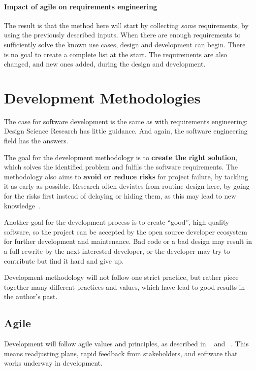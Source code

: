 \paragraph{Impact of agile on requirements engineering}
The result is that the method here will start by collecting \textit{some} requirements, by using the previously described inputs.
When there are enough requirements to sufficiently solve the known use cases, design and development can begin.
There is no goal to create a complete list at the start.
The requirements are also changed, and new ones added, during the design and development.


\section{Development Methodologies}

The case for software development is the same as with requirements engineering: Design Science Research has little guidance.
And again, the software engineering field has the answers.


The goal for the development methodology is to \textbf{create the right solution}, which solves the identified problem and fulfils the software requirements.
The methodology also aims to \textbf{avoid or reduce risks} for project failure, by tackling it as early as possible.
Research often deviates from routine design here, by going for the risks first instead of delaying or hiding them, as this may lead to new knowledge~\cite[p.~114]{oatesResearchingInformationSystems2006}.


Another goal for the development process is to create ``good'', high quality software, so the project can be accepted by the \gls{open source} developer ecosystem for further development and maintenance.
Bad code or a bad design may result in a full rewrite by the next interested developer, or the developer may try to contribute but find it hard and give up.


Development methodology will not follow one strict practice, but rather piece together many different practices and values, which have lead to good results in the author's past.


\subsection{Agile}

Development will follow agile values and principles, as described in ~\cite{kentbeckManifestoAgileSoftware2001} and ~\cite{PrinciplesAgileManifesto}.
This means readjusting plans, rapid feedback from stakeholders, and software that works underway in development.

